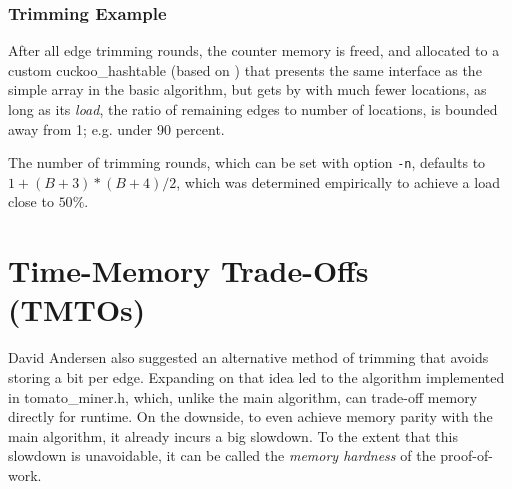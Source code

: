 \documentclass{beamer}
\begin{document}

\begin{frame}
\frametitle{Trimming Example}
\end{frame}

After all edge trimming rounds, the counter memory is freed, and allocated to a
custom cuckoo\_hashtable (based on \cite{preshing2013}) that presents the same interface as the
simple array in the basic algorithm, but gets by with much fewer locations, as long as its {\em load},
the ratio of remaining edges to number of locations, is bounded away from 1; e.g. under 90 percent.

The number of trimming rounds, which can be set with option {\tt -n}, defaults to
$1+(B+3)*(B+4)/2$, which was determined empirically to achieve a load close to $50\%$.

\section{Time-Memory Trade-Offs (TMTOs)}
David Andersen also suggested an alternative method of trimming that avoids storing a bit per edge.
Expanding on that idea led to the algorithm implemented in tomato\_miner.h,
which, unlike the main algorithm, can trade-off memory directly for runtime.
On the downside, to even achieve memory parity with the main algorithm, it already incurs a big slowdown.
To the extent that this slowdown is unavoidable, it can be called
the {\em memory hardness} of the proof-of-work.
\end{document}

